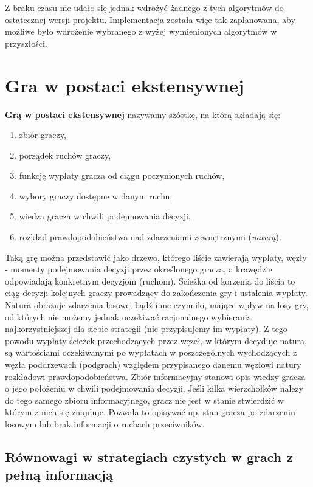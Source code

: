 \documentclass[polish]{standalone}
\begin{document}
Z braku czasu nie udało się jednak wdrożyć żadnego z tych algorytmów do ostatecznej wersji projektu. Implementacja
została więc tak zaplanowana, aby możliwe było wdrożenie wybranego z wyżej wymienionych algorytmów w przyszłości.

\section{Gra w postaci ekstensywnej}

\begin{definition}
\textbf{Grą w postaci ekstensywnej} nazywamy szóstkę, na którą składają się:
\begin{enumerate}
\item zbiór graczy,
\item porządek ruchów graczy,
\item funkcję wypłaty gracza od ciągu poczynionych ruchów,
\item wybory graczy dostępne w danym ruchu,
\item wiedza gracza w chwili podejmowania decyzji,
\item rozkład prawdopodobieństwa nad zdarzeniami zewnętrznymi (\textit{naturą}).
\end{enumerate}
\cite[str.~77--78]{FT-GT}
\end{definition}

Taką grę można przedstawić jako drzewo, którego liście zawierają wypłaty, węzły - momenty podejmowania decyzji przez
określonego gracza, a krawędzie odpowiadają konkretnym decyzjom (ruchom). Ścieżka od korzenia do liścia to ciąg decyzji
kolejnych graczy prowadzący do zakończenia gry i ustalenia wypłaty. Natura obrazuje zdarzenia losowe, bądź inne
czynniki, mające wpływ na losy gry, od których nie możemy jednak oczekiwać racjonalnego wybierania najkorzystniejszej
dla siebie strategii (nie przypisujemy im wypłaty). Z tego powodu wypłaty ścieżek przechodzących przez węzeł, w którym
decyduje natura, są wartościami oczekiwanymi po wypłatach w poszczególnych wychodzących z węzła poddrzewach (podgrach)
względem przypisanego danemu węzłowi natury rozkładowi prawdopodobieństwa. Zbiór informacyjny stanowi opis wiedzy
gracza o jego położeniu w chwili podejmowania decyzji. Jeśli kilka wierzchołków należy do tego samego zbioru
informacyjnego, gracz nie jest w stanie stwierdzić w którym z nich się znajduje. Pozwala to opisywać np. stan gracza po
zdarzeniu losowym lub brak informacji o ruchach przeciwników.

\subsection{Równowagi w strategiach czystych w grach z pełną informacją}
\end{document}
